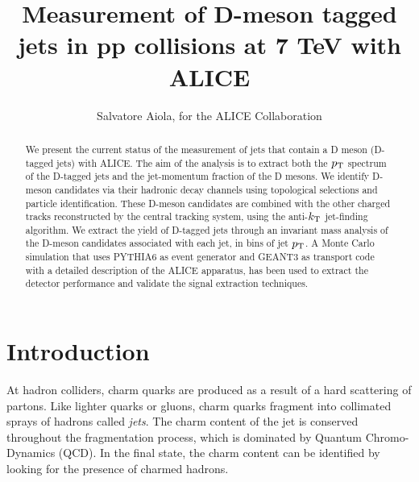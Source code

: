 \documentclass[a4paper]{jpconf}
\begin{document}
\title{Measurement of D-meson tagged jets in pp collisions at 7 TeV with ALICE}

\author{Salvatore Aiola, for the ALICE Collaboration}

\address{Physics Department, Yale University, 266 Whitney Avenue, New Haven, CT 06511}


\begin{abstract}
We present the current status of the measurement of jets that contain a D meson (D-tagged jets) with \mbox{ALICE}.
The aim of the analysis is to extract both the $p_{\rm T}$ spectrum of the D-tagged jets and the jet-momentum fraction of the D mesons. 
We identify D-meson candidates via their hadronic decay channels using topological selections and particle identification.
These D-meson candidates are combined with the other charged tracks reconstructed by the central tracking system, 
using the anti-$k_{\rm T}$ jet-finding algorithm.
We extract the yield of D-tagged jets through an invariant mass analysis of the D-meson candidates associated with each jet, 
in bins of jet $p_{\rm T}$.
A Monte Carlo simulation that uses PYTHIA6 as event generator and GEANT3 as transport code with a detailed description of the ALICE apparatus,
has been used to extract the detector performance and validate the signal extraction techniques.
\end{abstract}

\section{Introduction}
At hadron colliders, charm quarks are produced as a result of a hard scattering of partons. Like lighter quarks or gluons, charm quarks
fragment into collimated sprays of hadrons called \emph{jets}. The charm content of the jet is conserved throughout the fragmentation process,
which is dominated by Quantum Chromo-Dynamics (QCD).
In the final state, the charm content can be identified by looking for the presence of charmed hadrons.
\end{document}
